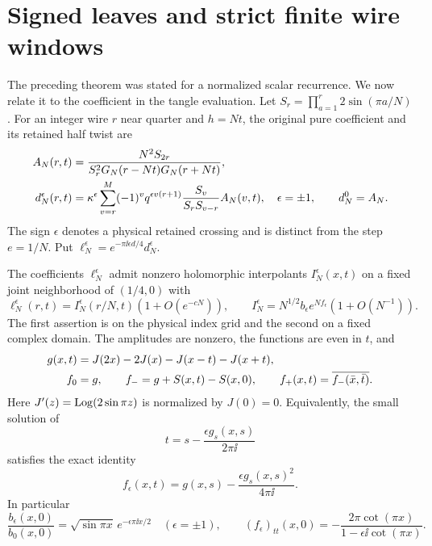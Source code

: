 \section{Signed leaves and strict finite wire windows}\label{qi:signed}

The preceding theorem was stated for a normalized scalar recurrence. We now relate it to the coefficient in the tangle evaluation. Let
$S_r=\prod_{a=1}^r2\sin(\pi a/N)$.
For an integer wire $r$ near quarter and $h=Nt$, the original pure coefficient and its retained half twist are
\begin{align}
 A_N(r,t)&=\frac{N^2S_{2r}}
 {S_r^2G_N(r-Nt)G_N(r+Nt)},\notag\\
 d_N^\epsilon(r,t)&=\kappa^\epsilon
 \sum_{v=r}^M(-1)^v q^{\epsilon v(r+1)}
                   \frac{S_v}{S_rS_{v-r}}A_N(v,t),
       \quad\epsilon=\pm1,\qquad d_N^0=A_N.\label{qi:signed-source}
\end{align}
The sign $\epsilon$ denotes a physical retained crossing and is distinct from the step $e=1/N$. Put
$\ell_N^\epsilon=e^{-\pi\ii\epsilon d/4}d_N^\epsilon$.

\begin{corollary}\label{qi:signed-corollary}
The coefficients $\ell_N^\epsilon$ admit nonzero holomorphic interpolants
$I_N^\epsilon(x,t)$ on a fixed joint neighborhood of $(1/4,0)$ with
\[
 \ell_N^\epsilon(r,t)=I_N^\epsilon(r/N,t)
                     (1+O(e^{-cN})),\qquad
 I_N^\epsilon=N^{1/2}b_\epsilon e^{Nf_\epsilon}
                     (1+O(N^{-1})).
\]
The first assertion is on the physical index grid and the second on a fixed complex domain. The amplitudes are nonzero, the functions are even in $t$, and
\begin{align}
 g(x,t)&=J(2x)-2J(x)-J(x-t)-J(x+t),\notag\\
 f_0&=g,\qquad f_-=g+S(x,t)-S(x,0),\qquad
 f_+(x,t)=\overline{f_-(\bar x,\bar t)}.\label{qi:actions}
\end{align}
Here $J'(z)=\operatorname{Log}(2\sin\pi z)$ is normalized by $J(0)=0$.
Equivalently, the small solution of
\begin{equation}\label{qi:shear}
 t=s-\frac{\epsilon g_s(x,s)}{2\pi\ii}
\end{equation}
satisfies the exact identity
\begin{equation}\label{qi:absolute-shear}
 f_\epsilon(x,t)=g(x,s)
                   -\frac{\epsilon g_s(x,s)^2}{4\pi\ii}.
\end{equation}
In particular
\[
 \frac{b_\epsilon(x,0)}{b_0(x,0)}
   =\sqrt{\sin\pi x}\,e^{-\epsilon\pi\ii x/2}
       \quad(\epsilon=\pm1),\qquad
 (f_\epsilon)_{tt}(x,0)
       =-\frac{2\pi\cot(\pi x)}{1-\epsilon\ii\cot(\pi x)}.
\]
\end{corollary}

